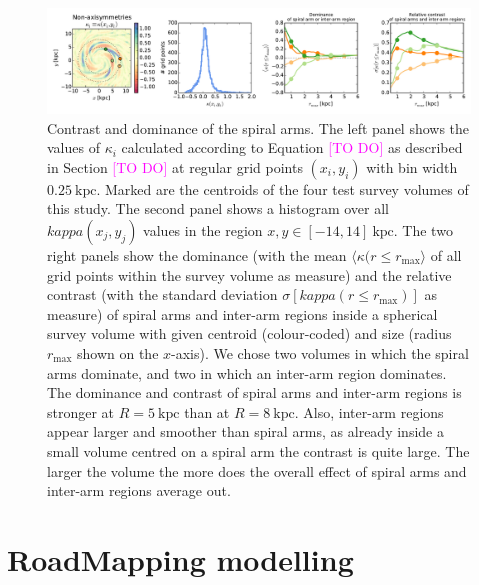 \documentclass[iop,revtex4,numberedappendix,appendixfloats]{emulateapj}
\newcommand{\Wilma}[1]{\textcolor{Magenta}{#1}}
\begin{document}
\begin{figure}[!htbp]
\centering
\includegraphics[width=\textwidth]{fig/whole_galaxy_kappa_i.pdf}
\caption{Contrast and dominance of the spiral arms. The left panel shows the values of $\kappa_i$ calculated according to Equation \Wilma{[TO DO]} as described in Section \Wilma{[TO DO]} at regular grid points $(x_i,y_i)$ with bin width $0.25~\text{kpc}$. Marked are the centroids of the four test survey volumes of this study. The second panel shows a histogram over all $kappa(x_j,y_j)$ values in the region $x,y \in [-14,14]~\text{kpc}$. The two right panels show the dominance (with the mean $\langle \kappa (r \leq r_\text{max} \rangle$ of all grid points within the survey volume as measure) and the relative contrast (with the standard deviation $\sigma[kappa (r \leq r_\text{max})]$ as measure) of spiral arms and inter-arm regions inside a spherical survey volume with given centroid (colour-coded) and size (radius $r_\text{max}$ shown on the $x$-axis). We chose two volumes in which the spiral arms dominate, and two in which an inter-arm region dominates. The dominance and contrast of spiral arms and inter-arm regions is stronger at $R=5~\text{kpc}$ than at $R=8~\text{kpc}$. Also, inter-arm regions appear larger and smoother than spiral arms, as already inside a small volume centred on a spiral arm the contrast is quite large. The larger the volume the more does the overall effect of spiral arms and inter-arm regions average out.}
\label{fig:???}
\end{figure}


\section{RoadMapping modelling}
\end{document}
